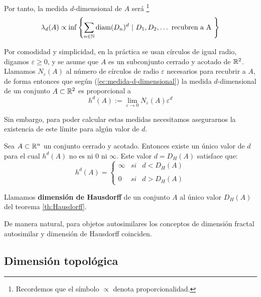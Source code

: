 Por tanto, la medida $d$-dimensional de $A$ será \footnote{Recordemos que el símbolo $\propto$ denota proporcionalidad.}
\begin{equation}\label{ec:medida-d-dimensional}
\lambda_d(A)\propto \inf\left\lbrace \sum_{n\in\mathbb{N}}\mathrm{diam}(D_n)^d \ | \  D_1,D_2,\dots \text{ recubren a A }\right\rbrace
\end{equation}

Por comodidad y simplicidad, en la práctica se usan círculos de igual radio, digamos $\varepsilon\geq 0$, y se asume que $A$ es un subconjunto cerrado y acotado de $\mathbb{R}^2$. Llamamos $N_\varepsilon(A)$ al número de círculos de radio $\varepsilon$ necesarios para recubrir a $A$, de forma entonces que según (\ref{ec:medida-d-dimensional}) la medida $d$-dimensional de un conjunto $A\subset\mathbb{R}^2$ es proporcional a
\begin{equation}
h^d(A):= \lim_{\varepsilon\rightarrow 0} N_\varepsilon(A)\varepsilon^d
\end{equation}

Sin embargo, para poder calcular estas medidas necesitamos asegurarnos la existencia de este límite para algún valor de $d$.

\begin{teorema}
\label{th:Hausdorff}
Sea $A\subset \mathbb{R}^n$ un conjunto cerrado y acotado. Entonces existe un único valor de $d$ para el cual $h^d(A)$ no es ni $0$ ni $\infty$. Este valor $d=D_H(A)$ satisface que:
\begin{equation}
h^d(A)= \left\{ \begin{array}{lcc}
             \infty &   si  & d < D_H(A) \\
             \\ 0 &  si & d > D_H(A) 
             \end{array}
   \right.
\end{equation}
\end{teorema} 

\begin{definicion}
Llamamos \textbf{dimensión de Hausdorff} de un conjunto $A$ al único valor $D_H(A)$ del teorema \ref{th:Hausdorff}.
\end{definicion}

De manera natural, para objetos autosimilares los conceptos de dimensión fractal autosimilar y dimensión de Hausdorff coinciden.


\subsection{Dimensión topológica}

